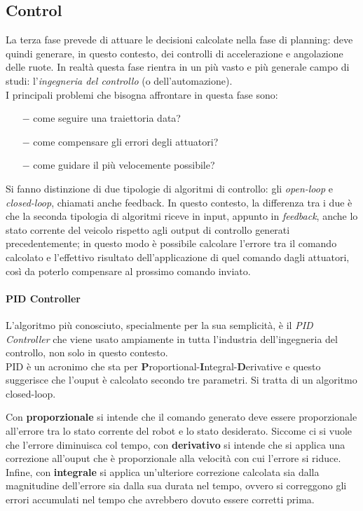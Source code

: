 \subsection{Control}
La terza fase prevede di attuare le decisioni calcolate nella fase di planning: deve quindi generare, in
questo contesto, dei controlli di accelerazione e angolazione delle ruote. In realtà questa fase rientra
in un più vasto e più generale campo di studi: l'\textit{ingegneria del controllo} (o dell'automazione).\\
I principali problemi che bisogna affrontare in questa fase sono:
\begin{itemize}
	\setlength\itemsep{0em}
	\item[$-$] come seguire una traiettoria data?
	\item[$-$] come compensare gli errori degli attuatori?
	\item[$-$] come guidare il più velocemente possibile?
\end{itemize}
Si fanno distinzione di due tipologie di algoritmi di controllo: gli \textit{open-loop} e
\textit{closed-loop}, chiamati anche feedback. In questo contesto, la differenza tra i due è che la
seconda tipologia di algoritmi riceve in input, appunto in \textit{feedback}, anche lo stato corrente del
veicolo rispetto agli output di controllo generati precedentemente; in questo modo è possibile calcolare
l'errore tra il comando calcolato e l'effettivo risultato dell'applicazione di quel comando dagli
attuatori, così da poterlo compensare al prossimo comando inviato.

\paragraph{PID Controller} 
\label{par:pid}
L'algoritmo più conosciuto, specialmente per la sua semplicità, è il \textit{PID Controller}
\cite{lection04, pid-wiki} che viene usato ampiamente in tutta l'industria dell'ingegneria del controllo,
non solo in questo contesto.\\ 
PID è un acronimo che sta per \textbf{P}roportional-\textbf{I}ntegral-\textbf{D}erivative e questo
suggerisce che l'ouput è calcolato secondo tre parametri. Si tratta di un algoritmo closed-loop.

Con \textbf{proporzionale} si intende che il comando generato deve essere proporzionale all'errore tra lo
stato corrente del robot e lo stato desiderato.
Siccome ci si vuole che l'errore diminuisca col tempo, con \textbf{derivativo} si intende che si applica
una correzione all'ouput che è proporzionale alla velocità con cui l’errore si riduce.
Infine, con \textbf{integrale} si applica un'ulteriore correzione calcolata sia dalla magnitudine
dell'errore sia dalla sua durata nel tempo, ovvero si correggono gli errori accumulati nel tempo che
avrebbero dovuto essere corretti prima.
\newpage
